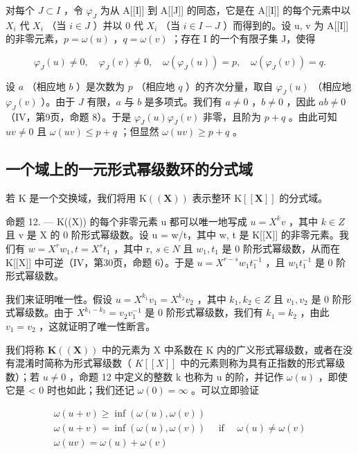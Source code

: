 对每个 \(J \subset I\) ，令 \(\varphi_{J}\) 为从 A{[}{[}I{]}{]} 到 A{[}{[}J{]}{]} 的同态，它是在 A{[}{[}I{]}{]} 的每个元素中以 \(X_{i}\) 代 \(X_{i}\) （当 \(i \in J\) ）并以 0 代 \(X_{i}\) （当 \(i \in I - J\) ）而得到的。设 u, v 为 A{[}{[}I{]}{]} 的非零元素，\(p = \omega(u)\) ，\(q = \omega(v)\) ；存在 I 的一个有限子集 J，使得

\[
\varphi_ {J} (u) \neq 0, \quad \varphi_ {J} (v) \neq 0, \quad \omega (\varphi_ {J} (u)) = p, \quad \omega (\varphi_ {J} (v)) = q.
\]

设 \(a\) （相应地 \(b\) ）是次数为 \(p\) （相应地 \(q\) ）的齐次分量，取自 \(\varphi_{J}(u)\) （相应地 \(\varphi_{J}(v)\) ）。由于 \(J\) 有限，\(a\) 与 \(b\) 是多项式。我们有 \(a \neq 0\) ，\(b \neq 0\) ，因此 \(ab \neq 0\) （IV，第9页，命题 8）。于是 \(\varphi_{J}(u) \varphi_{J}(v)\) 非零，且阶为 \(p + q\) 。由此可知 \(uv \neq 0\) 且 \(\omega(uv) \leqslant p + q\) ；但显然 \(\omega(uv) \geqslant p + q\) 。

\subsection{一个域上的一元形式幂级数环的分式域}

若 K 是一个交换域，我们将用 \(\mathrm{K}((\mathbf{X}))\) 表示整环 \(\mathrm{K}[[\mathbf{X}]]\) 的分式域。

命题 12. --- K((X)) 的每个非零元素 u 都可以唯一地写成 \(u = X^{k}v\) ，其中 \(k \in Z\) 且 v 是 X 的 0 阶形式幂级数。设 u = w/t，其中 w, t 是 K{[}{[}X{]}{]} 的非零元素。我们有 \(w = X^{r}w_{1}, t = X^{s}t_{1}\) ，其中 r, \(s \in N\) 且 \(w_{1}, t_{1}\) 是 0 阶形式幂级数，从而在 K{[}{[}X{]}{]} 中可逆（IV，第30页，命题 6）。于是 \(u = X^{r-s}w_{1}t_{1}^{-1}\) ，且 \(w_{1}t_{1}^{-1}\) 是 0 阶形式幂级数。

我们来证明唯一性。假设 \(u = X^{k_{1}}v_{1} = X^{k_{2}}v_{2}\) ，其中 \(k_{1}, k_{2} \in Z\) 且 \(v_{1}, v_{2}\) 是 0 阶形式幂级数。由于 \(X^{k_{1}-k_{2}} = v_{2}v_{1}^{-1}\) 是 0 阶形式幂级数，我们有 \(k_{1} = k_{2}\) ，由此 \(v_{1} = v_{2}\) ，这就证明了唯一性断言。

我们将称 \(\mathbf{K}((\mathbf{X}))\) 中的元素为 X 中系数在 K 内的广义形式幂级数，或者在没有混淆时简称为形式幂级数（ \(K[[X]]\) 中的元素则称为具有正指数的形式幂级数）；若 \(u \neq 0\) ，命题 12 中定义的整数 k 也称为 u 的阶，并记作 \(\omega(u)\) ，即使它是 \textless{} 0 时也如此；我们还记 \(\omega(0) = \infty\) 。可以立即验证

\[
\begin{array}{l} \omega (u + v) \geqslant \inf (\omega (u), \omega (v)) \\ \omega (u + v) = \inf (\omega (u), \omega (v)) \quad \text { if } \quad \omega (u) \neq \omega (v) \\ \omega (u v) = \omega (u) + \omega (v) \end{array}
\]

